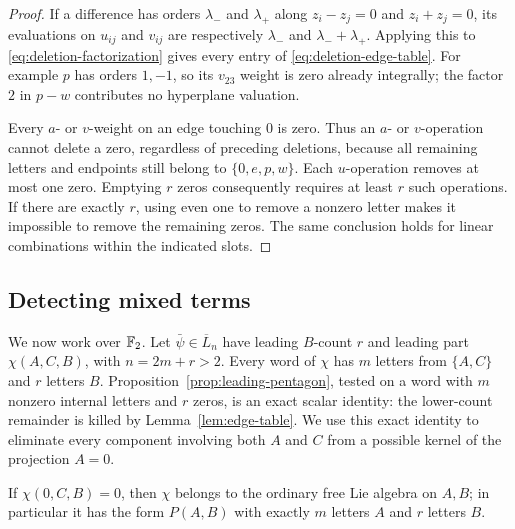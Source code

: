 \begin{proof}
If a difference has orders $\lambda_-$ and $\lambda_+$ along
$z_i-z_j=0$ and $z_i+z_j=0$, its evaluations on $u_{ij}$ and $v_{ij}$
are respectively $\lambda_-$ and $\lambda_-+\lambda_+$.  Applying this
to \eqref{eq:deletion-factorization} gives every entry of
\eqref{eq:deletion-edge-table}.  For example $p$ has orders $1,-1$,
so its $v_{23}$ weight is zero already integrally; the factor $2$ in
$p-w$ contributes no hyperplane valuation.

Every $a$- or $v$-weight on an edge touching $0$ is zero.  Thus an
$a$- or $v$-operation cannot delete a zero, regardless of preceding
deletions, because all remaining letters and endpoints still belong to
$\{0,e,p,w\}$.  Each $u$-operation removes at most one zero.  Emptying
$r$ zeros consequently requires at least $r$ such operations.  If there
are exactly $r$, using even one to remove a nonzero letter makes it
impossible to remove the remaining zeros.  The same conclusion holds
for linear combinations within the indicated slots.
\end{proof}

\subsection{Detecting mixed terms}
We now work over ${\mathbb F_2}$.  Let $\bar\psi\in\overline L_n$ have leading
$B$-count $r$ and leading part $\chi(A,C,B)$, with $n=2m+r>2$.
Every word of $\chi$ has $m$ letters from $\{A,C\}$ and $r$ letters
$B$.  Proposition~\ref{prop:leading-pentagon}, tested on a word with
$m$ nonzero internal letters and $r$ zeros, is an exact scalar identity:
the lower-count remainder is killed by Lemma~\ref{lem:edge-table}.
We use this exact identity to eliminate every component involving
both $A$ and $C$ from a possible kernel of the projection $A=0$.

\begin{lemma}\label{lem:deletion-kernel}
If $\chi(0,C,B)=0$, then $\chi$ belongs to the ordinary free Lie
algebra on $A,B$; in particular it has the form $P(A,B)$ with exactly
$m$ letters $A$ and $r$ letters $B$.
\end{lemma}

